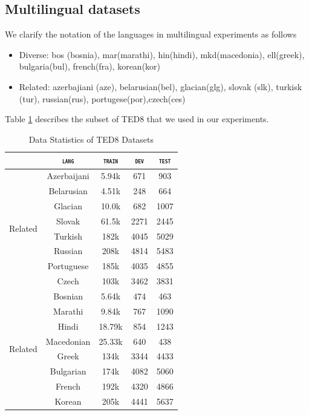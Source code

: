 \documentclass[11pt]{article}
\newcommand{\domain}[1]{\texttt{\textsc{#1}}}
\begin{document}
\subsection{Multilingual datasets}
We clarify the notation of the languages in multilingual experiments as follows
\begin{itemize}
	\item Diverse: bos (bosnia), mar(marathi),
         hin(hindi), mkd(macedonia), ell(greek),
         bulgaria(bul), french(fra), korean(kor) 
	\item Related: azerbajiani (aze), belarusian(bel),
          glacian(glg), slovak (slk), turkisk (tur),
		  russian(rus), portugese(por),czech(ces)
\end{itemize}
Table \ref{tab:Corpora-multilingual} describes the subset of TED8 that we used in our experiments.
\begin{table}
  \centering
  \begin{tabular}{l|cccc} 
  \hline
    \multicolumn{1}{c|}{} & \multicolumn{1}{c}{\domain{lang}} & \multicolumn{1}{c}{\domain{train}} & \multicolumn{1}{c}{\domain{dev}} & \multicolumn{1}{c}{\domain{test}} \\
    \hline 
    \multirow{8}{*}{Related} & Azerbaijani & 5.94k & 671 & 903 \\
							 & Belarusian & 4.51k & 248 & 664 \\
							 & Glacian & 10.0k & 682 & 1007 \\
							 & Slovak & 61.5k & 2271 & 2445 \\
							 & Turkish & 182k & 4045 & 5029 \\
                             & Russian & 208k & 4814 & 5483 \\
                             & Portuguese & 185k & 4035 & 4855 \\
                             & Czech & 103k & 3462 & 3831 \\
    \hline
    \multirow{8}{*}{Related} & Bosnian & 5.64k & 474 & 463 \\
                             & Marathi & 9.84k & 767 & 1090 \\
                             & Hindi & 18.79k & 854 & 1243 \\
                             & Macedonian & 25.33k & 640 & 438 \\
                             & Greek & 134k & 3344 & 4433 \\
                             & Bulgarian & 174k & 4082 & 5060 \\
                             & French & 192k & 4320 & 4866 \\
                             & Korean & 205k & 4441 & 5637 \\
  \end{tabular}
  \caption{Data Statistics of TED8 Datasets}
\label{tab:Corpora-multilingual}
\end{table}
\end{document}
